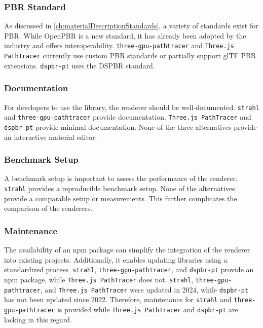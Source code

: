\subsubsection*{PBR Standard}

As discussed in \autoref{ch:materialDescriptionStandards}, a variety of standards exist for \gls{PBR}. While \gls{OpenPBR} is a new standard, it has already been adopted by the industry and offers interoperability. \texttt{three-gpu-pathtracer} and \texttt{Three.js PathTracer} currently use custom \gls{PBR} standards or partially support \gls{glTF} \gls{PBR} extensions. \texttt{dspbr-pt} uses the \gls{DSPBR} standard.

\subsubsection*{Documentation}

For developers to use the library, the renderer should be well-documented. \texttt{strahl} and \texttt{three-gpu-pathtracer} provide documentation. \texttt{Three.js PathTracer} and \texttt{dspbr-pt} provide minimal documentation. None of the three alternatives provide an interactive material editor.

\subsubsection*{Benchmark Setup}

A benchmark setup is important to assess the performance of the renderer. \texttt{strahl} provides a reproducible benchmark setup. None of the alternatives provide a comparable setup or measurements. This further complicates the comparison of the renderers.

\subsubsection*{Maintenance}

The availability of an \gls{npm} package can simplify the integration of the renderer into existing projects. Additionally, it enables updating libraries using a standardized process. \texttt{strahl}, \texttt{three-gpu-pathtracer}, and \texttt{dspbr-pt} provide an \gls{npm} package, while \texttt{Three.js PathTracer} does not. \texttt{strahl}, \texttt{three-gpu-pathtracer}, and \texttt{Three.js PathTracer} were updated in 2024, while \texttt{dspbr-pt} has not been updated since 2022. Therefore, maintenance for \texttt{strahl} and \texttt{three-gpu-pathtracer} is provided while \texttt{Three.js PathTracer} and \texttt{dspbr-pt} are lacking in this regard.


